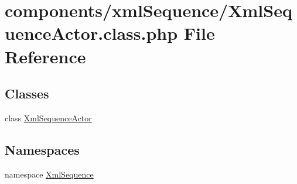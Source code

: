 \hypertarget{_xml_sequence_actor_8class_8php}{
\section{components/xmlSequence/XmlSequenceActor.class.php File Reference}
\label{_xml_sequence_actor_8class_8php}
}
\subsection*{Classes}
\begin{CompactItemize}
\item 
class \hyperlink{class_xml_sequence_actor}{XmlSequenceActor}
\end{CompactItemize}
\subsection*{Namespaces}
\begin{CompactItemize}
\item 
namespace \hyperlink{namespace_xml_sequence}{XmlSequence}
\end{CompactItemize}
